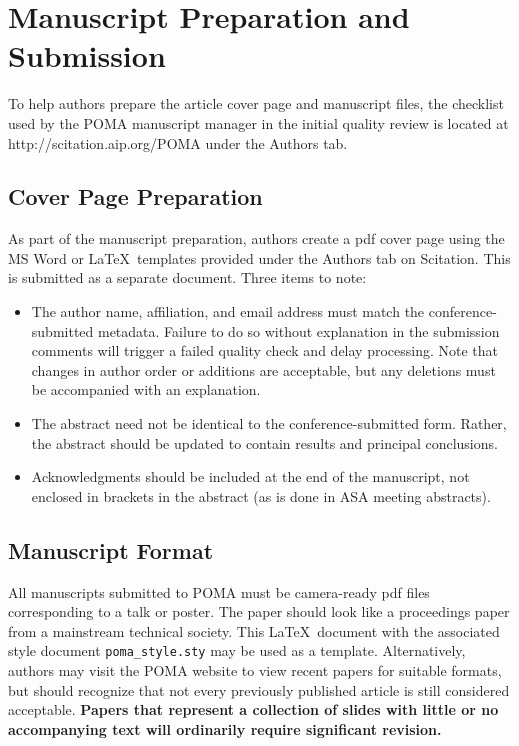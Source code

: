 \documentclass[12pt,letter]{article}
\begin{document}
\section{Manuscript Preparation and Submission}

To help authors prepare the article cover page and manuscript files, the checklist used by the POMA manuscript manager in the initial quality review is located at http://scitation.aip.org/POMA under the Authors tab.

\subsection{Cover Page Preparation}

As part of the manuscript preparation, authors create a pdf cover page using the MS Word or \LaTeX~templates provided under the Authors tab on Scitation. This is submitted as a separate document. Three items to note:

\begin{itemize}
	\item The author name, affiliation, and email address must match the conference-submitted metadata. Failure to do so without explanation in the submission comments will trigger a failed quality check and delay processing.  Note that changes in author order or additions are acceptable, but any deletions must be accompanied with an explanation.
	\item The abstract need not be identical to the conference-submitted form.  Rather, the abstract should be updated to contain results and principal conclusions.
	\item Acknowledgments should be included at the end of the manuscript, not enclosed in brackets in the abstract (as is done in ASA meeting abstracts).
\end{itemize}

\subsection{Manuscript Format}

All manuscripts submitted to POMA must be camera-ready pdf files corresponding to a talk or poster. The paper should look like a proceedings paper from a mainstream technical society. This \LaTeX~document with the associated style document \texttt{poma\_style.sty} may be used as a template.  Alternatively, authors may visit the POMA website to view recent papers for suitable formats, but should recognize that not every previously published article is still considered acceptable.  \textbf{Papers that represent a collection of slides with little or no accompanying text will ordinarily require significant revision.}
\end{document}
